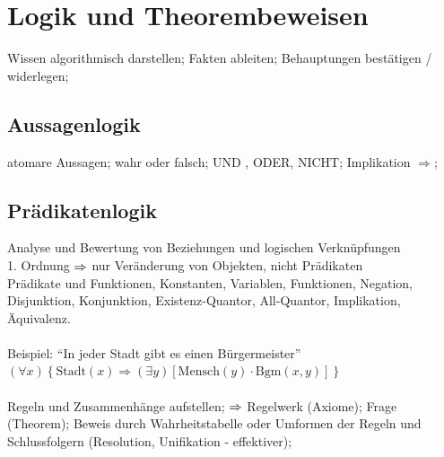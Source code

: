 \documentclass[german,color,6pt]{latex4ei/latex4ei_sheet}
\begin{document}
\columnbreak

\section{Logik und Theorembeweisen}
\begin{symbolbox}
Wissen algorithmisch darstellen; Fakten ableiten; Behauptungen bestätigen / widerlegen;
\end{symbolbox}

\begin{sectionbox}
\subsection{Aussagenlogik}
atomare Aussagen; wahr oder falsch; UND , ODER, NICHT; Implikation $\Rightarrow$;
\end{sectionbox}

\begin{sectionbox}
\subsection{Prädikatenlogik}
Analyse und Bewertung von Beziehungen und logischen Verknüpfungen\\
1. Ordnung $\Rightarrow$ nur Veränderung von Objekten, nicht Prädikaten\\
Prädikate und Funktionen, Konstanten, Variablen, Funktionen, Negation, Disjunktion, Konjunktion, Existenz-Quantor, All-Quantor, Implikation, Äquivalenz.\\\\
Beispiel: "`In jeder Stadt gibt es einen Bürgermeister"' \\
$(\forall x) \left\{ \text{Stadt}(x)  \Rightarrow (\exists y) \left[ \text{Mensch}(y) \cdot \text{Bgm}(x,y) \right] \right\}$\\\\
Regeln und Zusammenhänge aufstellen; $\Rightarrow$ Regelwerk (Axiome); Frage (Theorem); Beweis durch Wahrheitstabelle oder Umformen der Regeln und Schlussfolgern (Resolution, Unifikation - effektiver);
\end{sectionbox}
\end{document}
